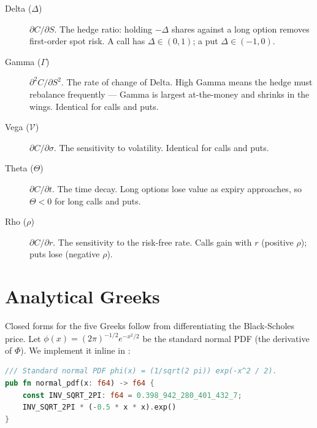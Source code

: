 \begin{description}
    \item[Delta ($\Delta$)] $\partial C / \partial S$. The hedge ratio:
      holding $-\Delta$ shares against a long option removes first-order
      spot risk. A call has $\Delta \in (0, 1)$; a put $\Delta \in (-1,
      0)$.
    \item[Gamma ($\Gamma$)] $\partial^2 C / \partial S^2$. The rate of
      change of Delta. High Gamma means the hedge must rebalance
      frequently --- Gamma is largest at-the-money and shrinks in the
      wings. Identical for calls and puts.
    \item[Vega ($\mathcal{V}$)] $\partial C / \partial \sigma$. The
      sensitivity to volatility. Identical for calls and puts.
    \item[Theta ($\Theta$)] $\partial C / \partial t$. The time decay.
      Long options lose value as expiry approaches, so $\Theta < 0$ for
      long calls and puts.
    \item[Rho ($\rho$)] $\partial C / \partial r$. The sensitivity to the
      risk-free rate. Calls gain with $r$ (positive $\rho$); puts lose
      (negative $\rho$).
\end{description}

\section{Analytical Greeks}


Closed forms for the five Greeks follow from differentiating the
Black-Scholes price. Let $\phi(x) = (2\pi)^{-1/2} e^{-x^2/2}$ be the
standard normal PDF (the derivative of $\Phi$). We implement it inline
in :

\begin{lstlisting}[language=Rust]
/// Standard normal PDF phi(x) = (1/sqrt(2 pi)) exp(-x^2 / 2).
pub fn normal_pdf(x: f64) -> f64 {
    const INV_SQRT_2PI: f64 = 0.398_942_280_401_432_7;
    INV_SQRT_2PI * (-0.5 * x * x).exp()
}
\end{lstlisting}

